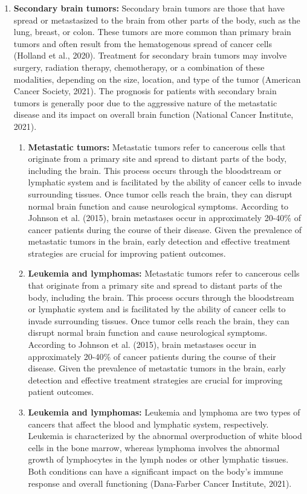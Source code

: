 \documentclass[12pt,oneside]{report}
\begin{document}
\begin{enumerate}
\begin{enumerate}
\end{enumerate}

\item \textbf{Secondary brain tumors:}
Secondary brain tumors are those that have spread or metastasized to the brain from other parts of the body, such as the lung, breast, or colon. These tumors are more common than primary brain tumors and often result from the hematogenous spread of cancer cells (Holland et al., 2020). Treatment for secondary brain tumors may involve surgery, radiation therapy, chemotherapy, or a combination of these modalities, depending on the size, location, and type of the tumor (American Cancer Society, 2021). The prognosis for patients with secondary brain tumors is generally poor due to the aggressive nature of the metastatic disease and its impact on overall brain function (National Cancer Institute, 2021).

\begin{enumerate}
\item \textbf{Metastatic tumors:}
Metastatic tumors refer to cancerous cells that originate from a primary site and spread to distant parts of the body, including the brain. This process occurs through the bloodstream or lymphatic system and is facilitated by the ability of cancer cells to invade surrounding tissues. Once tumor cells reach the brain, they can disrupt normal brain function and cause neurological symptoms. According to Johnson et al. (2015), brain metastases occur in approximately 20-40\% of cancer patients during the course of their disease. Given the prevalence of metastatic tumors in the brain, early detection and effective treatment strategies are crucial for improving patient outcomes.

\item \textbf{Leukemia and lymphomas:}
Metastatic tumors refer to cancerous cells that originate from a primary site and spread to distant parts of the body, including the brain. This process occurs through the bloodstream or lymphatic system and is facilitated by the ability of cancer cells to invade surrounding tissues. Once tumor cells reach the brain, they can disrupt normal brain function and cause neurological symptoms. According to Johnson et al. (2015), brain metastases occur in approximately 20-40\% of cancer patients during the course of their disease. Given the prevalence of metastatic tumors in the brain, early detection and effective treatment strategies are crucial for improving patient outcomes.

\item \textbf{Leukemia and lymphomas:}
Leukemia and lymphoma are two types of cancers that affect the blood and lymphatic system, respectively. Leukemia is characterized by the abnormal overproduction of white blood cells in the bone marrow, whereas lymphoma involves the abnormal growth of lymphocytes in the lymph nodes or other lymphatic tissues. Both conditions can have a significant impact on the body's immune response and overall functioning (Dana-Farber Cancer Institute, 2021).


\end{enumerate}
\end{enumerate}
\end{document}
